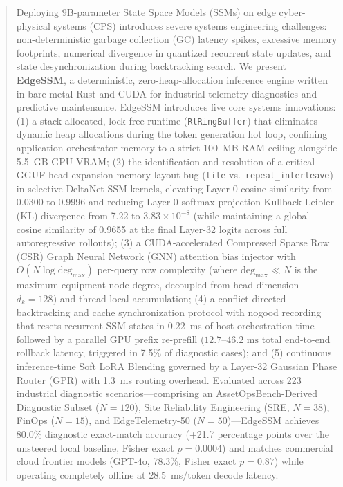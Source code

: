 \documentclass[journal]{IEEEtran}
\begin{document}
\begin{abstract}
Deploying 9B-parameter State Space Models (SSMs) on edge cyber-physical systems (CPS) introduces severe systems engineering challenges: non-deterministic garbage collection (GC) latency spikes, excessive memory footprints, numerical divergence in quantized recurrent state updates, and state desynchronization during backtracking search. We present \textbf{EdgeSSM}, a deterministic, zero-heap-allocation inference engine written in bare-metal Rust and CUDA for industrial telemetry diagnostics and predictive maintenance. EdgeSSM introduces five core systems innovations: (1) a stack-allocated, lock-free runtime (\texttt{RtRingBuffer}) that eliminates dynamic heap allocations during the token generation hot loop, confining application orchestrator memory to a strict 100~MB RAM ceiling alongside 5.5~GB GPU VRAM; (2) the identification and resolution of a critical GGUF head-expansion memory layout bug (\texttt{tile} vs.\ \texttt{repeat\_interleave}) in selective DeltaNet SSM kernels, elevating Layer-0 cosine similarity from 0.0300 to 0.9996 and reducing Layer-0 softmax projection Kullback-Leibler (KL) divergence from 7.22 to $3.83 \times 10^{-8}$ (while maintaining a global cosine similarity of 0.9655 at the final Layer-32 logits across full autoregressive rollouts); (3) a CUDA-accelerated Compressed Sparse Row (CSR) Graph Neural Network (GNN) attention bias injector with $O(N \log \text{deg}_{\max})$ per-query row complexity (where $\text{deg}_{\max} \ll N$ is the maximum equipment node degree, decoupled from head dimension $d_k=128$) and thread-local accumulation; (4) a conflict-directed backtracking and cache synchronization protocol with nogood recording that resets recurrent SSM states in 0.22~ms of host orchestration time followed by a parallel GPU prefix re-prefill ($12.7\text{--}46.2\text{ ms}$ total end-to-end rollback latency, triggered in 7.5\% of diagnostic cases); and (5) continuous inference-time Soft LoRA Blending governed by a Layer-32 Gaussian Phase Router (GPR) with 1.3~ms routing overhead. Evaluated across 223 industrial diagnostic scenarios---comprising an AssetOpsBench-Derived Diagnostic Subset ($N=120$), Site Reliability Engineering (SRE, $N=38$), FinOps ($N=15$), and EdgeTelemetry-50 ($N=50$)---EdgeSSM achieves 80.0\% diagnostic exact-match accuracy (+21.7 percentage points over the unsteered local baseline, Fisher exact $p=0.0004$) and matches commercial cloud frontier models (GPT-4o, 78.3\%, Fisher exact $p=0.87$) while operating completely offline at 28.5~ms/token decode latency.
\end{abstract}
\end{document}
